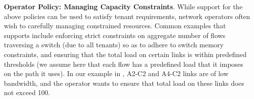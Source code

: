 \begin{compactitemize}
 

\item \textbf{Operator Policy: Managing Capacity Constraints}. While
  support for the above policies can be used to satisfy tenant 
  requirements, network operators often wish to
  carefully managing constrained resources. Common examples that \Name
  supports include enforcing strict constraints on aggregate number of
  flows traversing a switch (due to all tenants) so as to adhere to
  switch memory constraints, and ensuring that the total load on
  certain links is within predefined thresholds (we assume here that
  each flow has a predefined load that it imposes on the path it
  uses). In our example in , A2-C2 and A4-C2
  links are of low bandwidth, and the operator wants to ensure that
  total load on these links does not exceed 100.


\end{compactitemize}
